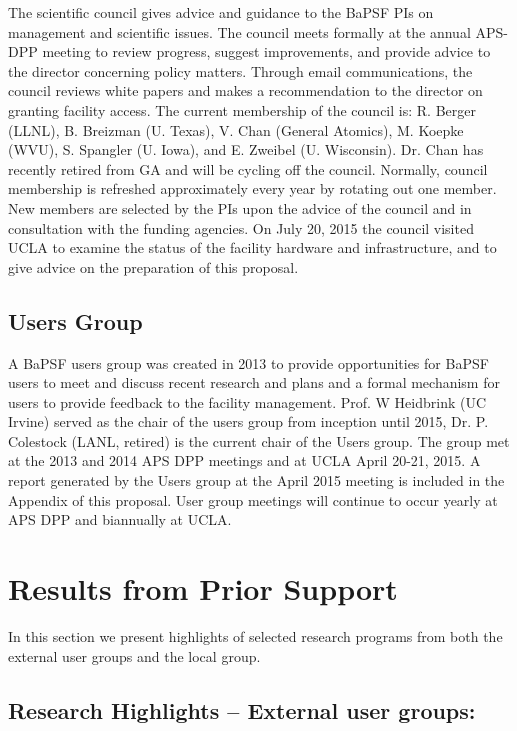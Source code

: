 \documentclass[11pt]{article}
\begin{document}
The scientific council gives advice and guidance to the BaPSF PIs on
management and scientific issues. The council meets formally at the
annual APS-DPP meeting to review progress, suggest improvements, and
provide advice to the director concerning policy matters. Through email
communications, the council reviews white papers and makes a
recommendation to the director on granting facility access. The current
membership of the council is: R. Berger (LLNL), B. Breizman (U. Texas),
V. Chan (General Atomics), M. Koepke (WVU), S. Spangler (U. Iowa), and
E. Zweibel (U. Wisconsin). Dr. Chan has recently retired from GA and
will be cycling off the council. Normally, council membership is
refreshed approximately every year by rotating out one member. New
members are selected by the PIs upon the advice of the council and in
consultation with the funding agencies. On July 20, 2015 the council
visited UCLA to examine the status of the facility hardware and
infrastructure, and to give advice on the preparation of this proposal.


\subsection{Users Group}

A BaPSF users group was created in 2013 to provide opportunities for
BaPSF users to meet and discuss recent research and plans and a formal
mechanism for users to provide feedback to the facility
management. Prof. W Heidbrink (UC Irvine) served as the chair of the
users group from inception until 2015, Dr. P. Colestock (LANL,
retired) is the current chair of the Users group.  The group met at
the 2013 and 2014 APS DPP meetings and at UCLA April 20-21, 2015.  A
report generated by the Users group at the April 2015 meeting is
included in the Appendix of this proposal. User group meetings will
continue to occur yearly at APS DPP and biannually at UCLA.


\section{Results from Prior Support}

In this section we present highlights of selected research programs from
both the external user groups and the local group.   

\subsection{Research Highlights -- External user groups:}
\end{document}
